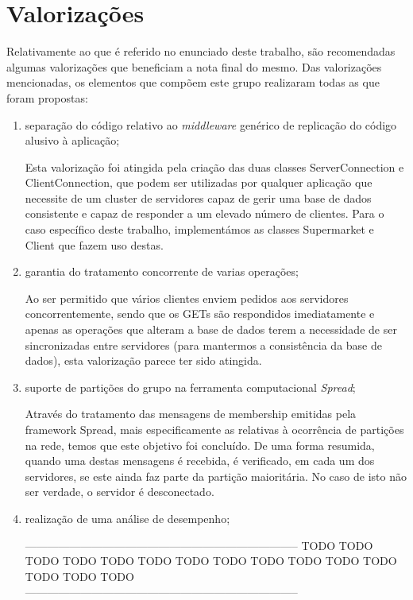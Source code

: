 \documentclass[a4paper]{report}
\begin{document}
\chapter{Valorizações} \label{ch:ProblemDescription}
\large{
	Relativamente ao que é referido no enunciado deste trabalho, são recomendadas algumas valorizações que beneficiam a nota final do mesmo.
	Das valorizações mencionadas, os elementos que compõem este grupo realizaram todas as que foram propostas:
	\begin{enumerate}
		\item separação do código relativo ao \textit{middleware} genérico de replicação do código alusivo à aplicação;
		
		Esta valorização foi atingida pela criação das duas classes ServerConnection e ClientConnection, que podem ser utilizadas por qualquer aplicação que necessite de um cluster de servidores capaz de gerir uma base de dados consistente e capaz de responder a um elevado número de clientes. Para o caso específico deste trabalho, implementámos as classes Supermarket e Client que fazem uso destas.
		
		\item garantia do tratamento concorrente de varias operações;
		
		Ao ser permitido que vários clientes enviem pedidos aos servidores concorrentemente, sendo que os GETs são  respondidos imediatamente e apenas as operações que alteram a base de dados terem a necessidade de ser sincronizadas entre servidores (para mantermos a consistência da base de dados), esta valorização parece ter sido atingida.
		
		\item suporte de partições do grupo na ferramenta computacional \textit{Spread};
		
		Através do tratamento das mensagens de membership emitidas pela framework Spread, mais especificamente as relativas à ocorrência de partições na rede, temos que este objetivo foi concluído. De uma forma resumida, quando uma destas mensagens é recebida, é verificado, em cada um dos servidores, se este ainda faz parte da partição maioritária. No caso de isto não ser verdade, o servidor é desconectado.
		
		\item realização de uma análise de desempenho;
		
		--------------------------------------------------------------------------
		TODO TODO TODO TODO TODO TODO TODO TODO TODO TODO TODO TODO TODO TODO TODO
		--------------------------------------------------------------------------
		

\end{enumerate}}
\end{document}

